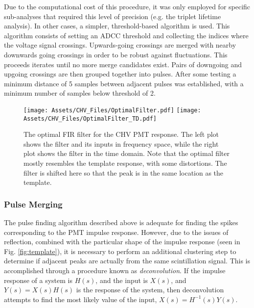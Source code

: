 Due to the computational cost of this procedure, it was only employed for specific sub-analyses that required this level of precision (e.g. the triplet lifetime analysis).
In other cases, a simpler, threshold-based algorithm is used.
This algorithm consists of setting an ADCC threshold and collecting the indices where the voltage signal crossings.
Upwards-going crossings are merged with nearby downwards going crossings in order to be robust against fluctuations.
This proceeds iterates until no more merge candidates exist.
Pairs of downgoing and upgoing crossings are then grouped together into pulses.
After some testing a minimum distance of 5 samples between adjacent pulses was established, with a minimum number of samples below threshold of 2.

\begin{figure}
    \centering
    \texttt{[image: Assets/CHV\_Files/OptimalFilter.pdf]} 
    \texttt{[image: Assets/CHV\_Files/OptimalFilter\_TD.pdf]} 
    \caption[The optimal FIR filter for the CHV PMT response.]%
    {The optimal FIR filter for the CHV PMT response.
    The left plot shows the filter and its inputs in frequency space, while the right plot shows the filter in the time domain. 
    Note that the optimal filter mostly resembles the template response, with some distortions. The filter is shifted here so that the peak is in the same location as the template. }
    \label{fig:optfilt}
\end{figure}

\subsubsection{Pulse Merging}
The pulse finding algorithm described above is adequate for finding the spikes corresponding to the PMT impulse response.
However, due to the issues of reflection, combined with the particular shape of the impulse response (seen in Fig. \ref{fig:template}), it is necessary to perform an additional clustering step to determine if adjacent peaks are actually from the same scintillation signal.
This is accomplished through a procedure known as \textit{deconvolution}.
If the impulse response of a system is $H(s)$, and the input is $X(s)$, and $Y(s) = X(s)H(s)$ is the response of the system, then deconvolution attempts to find the most likely value of the input, $X(s) = H^{-1}(s)Y(s)$.

